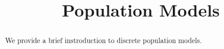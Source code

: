 \documentclass{ximera}
\title{Population Models}
\begin{document}
  
\begin{abstract}  
We provide a brief instroduction to discrete population models.
\end{abstract}  
\maketitle

\section{}
\end{document}
